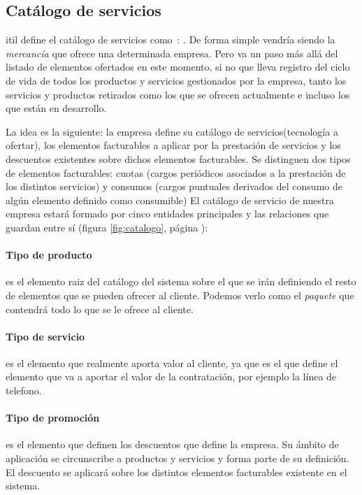\subsection{Catálogo de servicios}
\label{sub:catalogo}

\acrshort{itil} define el catálogo de servicios como~\cite{catalogoITIL}:
. De forma simple vendría siendo la \textit{mercancía} que ofrece una determinada empresa. Pero va un paso más allá del listado de elementos ofertados en este momento, si no que  lleva registro del ciclo de vida de todos los productos y servicios gestionados por la empresa, tanto los servicios y productos retirados como los que se ofrecen actualmente e incluso los que están en desarrollo.

La idea es la siguiente: la empresa define su catálogo de servicios(tecnología a ofertar), los elementos facturables a aplicar por la prestación de servicios y los descuentos existentes sobre dichos elementos facturables. Se distinguen dos tipos de elementos facturables: cuotas (cargos periódicos asociados a la prestación de los distintos servicios) y consumos (cargos puntuales derivados del consumo de algún elemento definido como consumible)
El catálogo de servicio de nuestra empresa estará formado por cinco entidades principales y las relaciones que guardan entre sí (figura \ref{fig:catalogo}, página \pageref{fig:catalogo}):

\paragraph{Tipo de producto} es el elemento raiz del catálogo del sistema sobre el que se irán definiendo el resto de elementos que se pueden ofrecer al cliente. Podemos verlo como el \textit{paquete} que contendrá todo lo que se le ofrece al cliente.
\paragraph{Tipo de servicio} es el elemento que realmente aporta valor al cliente, ya que es el que define el elemento que va a aportar el valor de la contratación, por ejemplo la línea de telefono.
\paragraph{Tipo de promoción} es el elemento que definen los descuentos que define la empresa. Su ámbito de aplicación se circunscribe a productos y servicios y forma parte de su definición. El descuento se aplicará sobre los distintos elementos facturables existente en el sistema.
